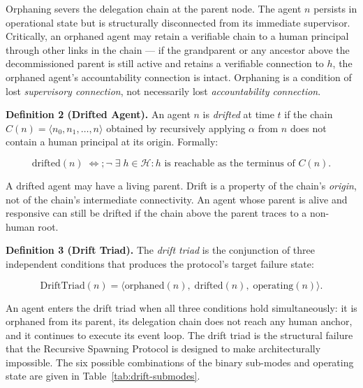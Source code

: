 Orphaning severs the delegation chain at the parent node. The agent $n$ persists in operational state but is structurally disconnected from its immediate supervisor. Critically, an orphaned agent may retain a verifiable chain to a human principal through other links in the chain — if the grandparent or any ancestor above the decommissioned parent is still active and retains a verifiable connection to $h$, the orphaned agent's accountability connection is intact. Orphaning is a condition of lost \emph{supervisory connection}, not necessarily lost \emph{accountability connection}.

\medskip
\noindent\textbf{Definition 2 (Drifted Agent).}
An agent $n$ is \emph{drifted} at time $t$ if the chain $C(n) = \langle n_0, n_1, \ldots, n \rangle$ obtained by recursively applying $\alpha$ from $n$ does not contain a human principal at its origin. Formally:

\begin{equation}
\mathrm{drifted}(n) \;\iff;\neg\;\exists\; h \in \mathcal{H} : h \text{ is reachable as the terminus of } C(n).
\label{eq:drifted-def}
\end{equation}

A drifted agent may have a living parent. Drift is a property of the chain's \emph{origin}, not of the chain's intermediate connectivity. An agent whose parent is alive and responsive can still be drifted if the chain above the parent traces to a non-human root.

\medskip
\noindent\textbf{Definition 3 (Drift Triad).}
The \emph{drift triad} is the conjunction of three independent conditions that produces the protocol's target failure state:

\begin{equation}
\mathrm{DriftTriad}(n) = \langle \mathrm{orphaned}(n),\; \mathrm{drifted}(n),\; \mathrm{operating}(n) \rangle.
\label{eq:drift-triad}
\end{equation}

An agent enters the drift triad when all three conditions hold simultaneously: it is orphaned from its parent, its delegation chain does not reach any human anchor, and it continues to execute its event loop. The drift triad is the structural failure that the Recursive Spawning Protocol is designed to make architecturally impossible. The six possible combinations of the binary sub-modes and operating state are given in Table~\ref{tab:drift-submodes}.

